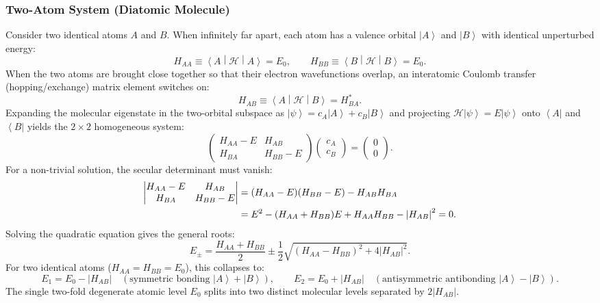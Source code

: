 \documentclass[11pt,a4paper]{article}
\newcommand{\ket}[1]{\left|#1\right\rangle}
\newcommand{\bra}[1]{\left\langle #1\right|}
\newcommand{\mel}[3]{\left\langle #1 \middle| #2 \middle| #3 \right\rangle}
\newcommand{\abs}[1]{\left|#1\right|}
\begin{document}
\subsubsection{Two-Atom System (Diatomic Molecule)}
Consider two identical atoms $A$ and $B$. When infinitely far apart, each atom has a valence orbital $\ket{A}$ and $\ket{B}$ with identical unperturbed energy:
\begin{equation}
    H_{AA} \equiv \mel{A}{\mathcal{H}}{A} = E_0, \qquad H_{BB} \equiv \mel{B}{\mathcal{H}}{B} = E_0.
\end{equation}
When the two atoms are brought close together so that their electron wavefunctions overlap, an interatomic Coulomb transfer (hopping/exchange) matrix element switches on:
\begin{equation}
    H_{AB} \equiv \mel{A}{\mathcal{H}}{B} = H_{BA}^*.
\end{equation}
Expanding the molecular eigenstate in the two-orbital subspace as $\ket{\psi} = c_A\ket{A} + c_B\ket{B}$ and projecting $\mathcal{H}\ket{\psi} = E\ket{\psi}$ onto $\bra{A}$ and $\bra{B}$ yields the $2\times 2$ homogeneous system:
\begin{equation}
    \begin{pmatrix} H_{AA} - E & H_{AB} \\ H_{BA} & H_{BB} - E \end{pmatrix}
    \begin{pmatrix} c_A \\ c_B \end{pmatrix} = \begin{pmatrix} 0 \\ 0 \end{pmatrix}.
\end{equation}
For a non-trivial solution, the secular determinant must vanish:
\begin{align}
    \begin{vmatrix} H_{AA} - E & H_{AB} \\ H_{BA} & H_{BB} - E \end{vmatrix} &= (H_{AA} - E)(H_{BB} - E) - H_{AB}H_{BA} \notag\\
    &= E^2 - (H_{AA} + H_{BB})E + H_{AA}H_{BB} - \abs{H_{AB}}^2 = 0.
    \label{eq:diatomic_secular}
\end{align}
Solving the quadratic equation gives the general roots:
\begin{equation}
    E_\pm = \frac{H_{AA} + H_{BB}}{2} \pm \frac{1}{2}\sqrt{(H_{AA} - H_{BB})^2 + 4\abs{H_{AB}}^2}.
\end{equation}
For two identical atoms ($H_{AA} = H_{BB} = E_0$), this collapses to:
\begin{equation}
    \boxed{E_1 = E_0 - \abs{H_{AB}} \quad (\text{symmetric bonding } \ket{A}+\ket{B}), \qquad E_2 = E_0 + \abs{H_{AB}} \quad (\text{antisymmetric antibonding } \ket{A}-\ket{B}).}
\end{equation}
The single two-fold degenerate atomic level $E_0$ splits into two distinct molecular levels separated by $2\abs{H_{AB}}$.
\end{document}
